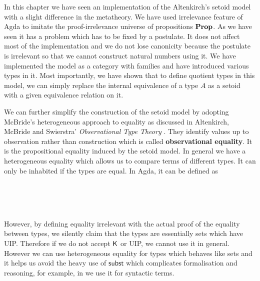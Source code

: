 In this chapter we have seen an implementation of the Altenkirch's setoid model with a slight difference in the metatheory. We have used irrelevance feature of Agda to imitate the proof-irrelevance universe of propositions $\operatorname{\mathbf{Prop}}$. As we have seen it has a problem which has to be fixed by a postulate. It does not affect most of the implementation and we do not lose canonicity because the postulate is irrelevant so that we cannot construct natural numbers using it. We have implemented the model as a category with families and have introduced various types in it. Most importantly, we have shown that to define quotient types in this model, we can simply replace the internal equivalence of a type $A$ as a setoid with a given equivalence relation on it. 

We can further simplify the construction of the setoid model by adopting McBride's heterogeneous approach to equality as discussed in Altenkirch, McBride and Swierstra' \emph{Observational Type Theory} \cite{alti:ott-conf}. They identify values up to observation rather than construction which is called \textbf{observational equality}. It is the propositional equality induced by the setoid model.  In general we have a heterogeneous equality which allows us to compare terms of different types. It can only be inhabited if the types are equal. In Agda, it can be defined as

\begin{code}
\\
\>  \AgdaSymbol{\{} \AgdaSymbol{:} \AgdaSymbol{\}} \AgdaSymbol{(} \AgdaSymbol{:} \AgdaSymbol{)} \AgdaSymbol{:}  \AgdaSymbol{:} \AgdaSymbol{\}}     \<%
\\
\>[0]\<[2]%
\>[2] \AgdaSymbol{:}   \<%
\\
\end{code}


However, by defining equality irrelevant with the actual proof of the equality between types, we silently claim that the types are essentially sets which have UIP. Therefore if we do not accept $\operatorname{\mathsf{K}}$ or UIP, we cannot use it in general. However we can use heterogeneous equality for types which behaves like sets and it helps us avoid the heavy use of $\mathsf{subst}$ which complicates formalisation and reasoning, for example, in  we use it for syntactic terms.








